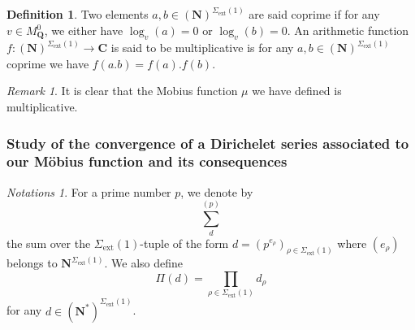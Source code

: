 \documentclass{proc-l}
\newcommand{\C}{\mathbf{C}}
\newcommand{\N}{\mathbf{N}}
\newcommand{\Q}{\mathbf{Q}}
\DeclareMathOperator{\ext}{ext}
\newcommand{\sheafI}{\mathcal{I}}
\newcommand{\twistsector}{\pi_0^*(\sheafI_{\mu} X)}
\newtheorem{prop}[theorem]{Proposition}
\theoremstyle{definition}
\newtheorem{definition}[theorem]{Definition}
\theoremstyle{remark}
\newtheorem{remark}[theorem]{Remark}
\newtheorem{Notations}[theorem]{Notations}
\numberwithin{equation}{section}
\begin{document}

\begin{definition}
    Two elements $a, b \in (\N )^{\Sigma_{\ext}(1)}$ are said coprime if for any $v \in M_{\Q}^0$, we either have $\log_v(a) = 0 $ or $\log_v(b) = 0$.
    An arithmetic function $f : (\N )^{\Sigma_{\ext}(1)} \rightarrow \C$ is said to be multiplicative is for any $a, b \in (\N )^{\Sigma_{\ext}(1)}$ coprime we have $f(a.b) = f(a).f(b)$.
\end{definition}

\begin{remark}\label{remark_multiplicativity_of_mobius_function}
    It is clear that the Mobius function $\mu$ we have defined is multiplicative.
\end{remark}






\subsubsection{Study of the convergence of a Dirichelet series associated to our Möbius function and its consequences}

\begin{Notations}
    For a prime number $p$, we denote by $$\sum\limits_{d}^{(p)}$$ the sum over the $\Sigma_{\ext}(1)$-tuple of the form $d = (p^{e_{\rho}})_{\rho \in \Sigma_{\ext}(1)}$ where $(e_{\rho})$ belongs to $\N^{\Sigma_{\ext}(1)}$. We also define $$\Pi(d) = \prod\limits_{\rho \in \Sigma_{\ext}(1)} d_{\rho}$$ for any $d \in (\N^*)^{\Sigma_{\ext}(1)}$.
\end{Notations}
\end{document}
